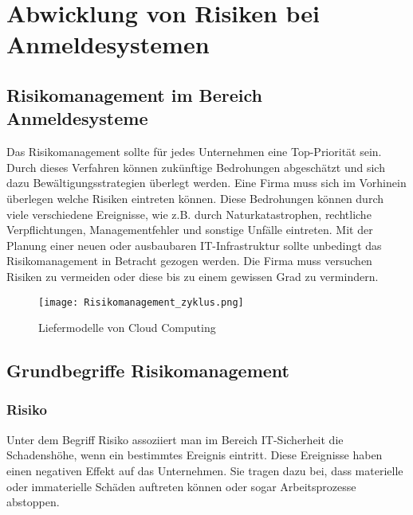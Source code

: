 \chapter{Abwicklung von Risiken bei Anmeldesystemen}

\section{Risikomanagement im Bereich Anmeldesysteme}
Das Risikomanagement sollte für jedes Unternehmen eine Top-Priorität sein. Durch dieses Verfahren können zukünftige Bedrohungen abgeschätzt und sich dazu Bewältigungsstrategien überlegt werden. Eine Firma muss sich im Vorhinein überlegen welche Risiken eintreten können. Diese Bedrohungen können durch viele verschiedene Ereignisse, wie z.B. durch Naturkatastrophen, rechtliche Verpflichtungen, Managementfehler und sonstige Unfälle eintreten.
Mit der Planung einer neuen oder ausbaubaren IT-Infrastruktur sollte unbedingt das Risikomanagement in Betracht gezogen werden. Die Firma muss versuchen Risiken zu vermeiden oder diese bis zu einem gewissen Grad zu vermindern. 

\begin{center}
\begin{figure}[h]
    \centering
    \texttt{[image: Risikomanagement\_zyklus.png]}
    \caption{Liefermodelle von Cloud Computing}
\end{figure}
\end{center}

\newpage

\section{Grundbegriffe Risikomanagement}
\subsection{Risiko}
Unter dem Begriff Risiko assoziiert man im Bereich IT-Sicherheit die Schadenshöhe, wenn ein bestimmtes Ereignis eintritt. Diese Ereignisse haben einen negativen Effekt auf das Unternehmen. Sie tragen dazu bei, dass materielle oder immaterielle Schäden auftreten können oder sogar Arbeitsprozesse abstoppen.
\\

